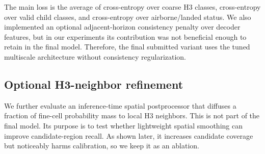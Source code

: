 The main loss is the average of cross-entropy over coarse H3 classes, cross-entropy over valid child classes, and cross-entropy over airborne/landed status. We also implemented an optional adjacent-horizon consistency penalty over decoder features, but in our experiments its contribution was not beneficial enough to retain in the final model. Therefore, the final submitted variant uses the tuned multiscale architecture without consistency regularization.

\subsection{Optional H3-neighbor refinement}

We further evaluate an inference-time spatial postprocessor that diffuses a fraction of fine-cell probability mass to local H3 neighbors. This is not part of the final model. Its purpose is to test whether lightweight spatial smoothing can improve candidate-region recall. As shown later, it increases candidate coverage but noticeably harms calibration, so we keep it as an ablation.
